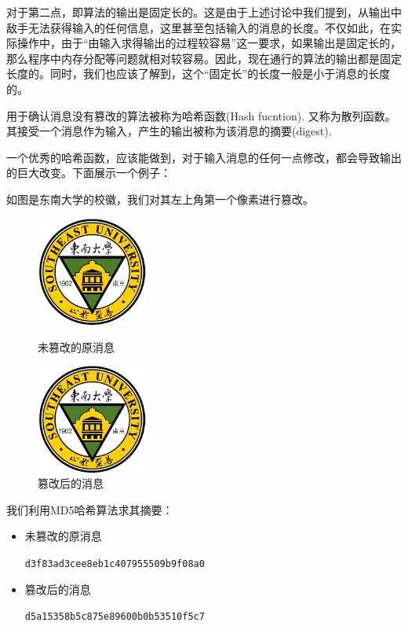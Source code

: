 对于第二点，即算法的输出是固定长的。这是由于上述讨论中我们提到，从输出中敌手无法获得输入的任何信息，这里甚至包括输入的消息的长度。不仅如此，在实际操作中，由于“由输入求得输出的过程较容易”这一要求，如果输出是固定长的，那么程序中内存分配等问题就相对较容易。因此，现在通行的算法的输出都是固定长度的。同时，我们也应该了解到，这个“固定长”的长度一般是小于消息的长度的。\par
用于确认消息没有篡改的算法被称为哈希函数(Hash fucntion). 又称为散列函数。其接受一个消息作为输入，产生的输出被称为该消息的摘要(digest).\par
一个优秀的哈希函数，应该能做到，对于输入消息的任何一点修改，都会导致输出的巨大改变。下面展示一个例子：\par
如图是东南大学的校徽，我们对其左上角第一个像素进行篡改。
\begin{figure}[H]
\centering
\begin{minipage}[t]{0.49\textwidth}
\centering
\includegraphics[width=10em]{chapters/chapter_6/MD5_unchanged.jpg}
\caption{未篡改的原消息}
\end{minipage}
\begin{minipage}[t]{0.49\textwidth}
\centering
\includegraphics[width=10em]{chapters/chapter_6/MD5_changed.jpg}
\caption{篡改后的消息}
\end{minipage}
\end{figure}

我们利用MD5哈希算法求其摘要：
\begin{itemize}
	\item 未篡改的原消息\par
	\verb`d3f83ad3cee8eb1c407955509b9f08a0`
	\item 篡改后的消息\par
	\verb`d5a15358b5c875e89600b0b53510f5c7`
\end{itemize}

